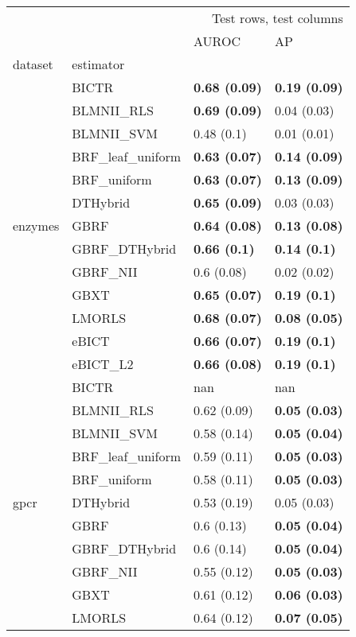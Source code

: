 \begin{tabular}{llll}
\toprule
 &  & \multicolumn{2}{r}{Test rows, test columns} \\
 &  & AUROC & AP \\
dataset & estimator &  &  \\
\midrule
\multirow[c]{13}{*}{enzymes} & BICTR & \textbf{0.68 (0.09)} & \textbf{0.19 (0.09)} \\
 & BLMNII\_RLS & \textbf{0.69 (0.09)} & 0.04 (0.03) \\
 & BLMNII\_SVM & 0.48 (0.1) & 0.01 (0.01) \\
 & BRF\_leaf\_uniform & \textbf{0.63 (0.07)} & \textbf{0.14 (0.09)} \\
 & BRF\_uniform & \textbf{0.63 (0.07)} & \textbf{0.13 (0.09)} \\
 & DTHybrid & \textbf{0.65 (0.09)} & 0.03 (0.03) \\
 & GBRF & \textbf{0.64 (0.08)} & \textbf{0.13 (0.08)} \\
 & GBRF\_DTHybrid & \textbf{0.66 (0.1)} & \textbf{0.14 (0.1)} \\
 & GBRF\_NII & 0.6 (0.08) & 0.02 (0.02) \\
 & GBXT & \textbf{0.65 (0.07)} & \textbf{0.19 (0.1)} \\
 & LMORLS & \textbf{0.68 (0.07)} & \textbf{0.08 (0.05)} \\
 & eBICT & \textbf{0.66 (0.07)} & \textbf{0.19 (0.1)} \\
 & eBICT\_L2 & \textbf{0.66 (0.08)} & \textbf{0.19 (0.1)} \\
\cline{1-2}
\multirow[c]{13}{*}{gpcr} & BICTR & nan & nan \\
 & BLMNII\_RLS & 0.62 (0.09) & \textbf{0.05 (0.03)} \\
 & BLMNII\_SVM & 0.58 (0.14) & \textbf{0.05 (0.04)} \\
 & BRF\_leaf\_uniform & 0.59 (0.11) & \textbf{0.05 (0.03)} \\
 & BRF\_uniform & 0.58 (0.11) & \textbf{0.05 (0.03)} \\
 & DTHybrid & 0.53 (0.19) & 0.05 (0.03) \\
 & GBRF & 0.6 (0.13) & \textbf{0.05 (0.04)} \\
 & GBRF\_DTHybrid & 0.6 (0.14) & \textbf{0.05 (0.04)} \\
 & GBRF\_NII & 0.55 (0.12) & \textbf{0.05 (0.03)} \\
 & GBXT & 0.61 (0.12) & \textbf{0.06 (0.03)} \\
 & LMORLS & 0.64 (0.12) & \textbf{0.07 (0.05)} \\

\end{tabular}

